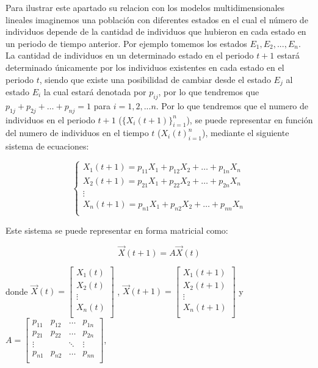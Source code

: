 Para ilustrar este apartado su relacion con los modelos multidimensionales lineales imaginemos una población con diferentes estados en el cual el número de individuos depende de la cantidad de individuos que hubieron en cada estado en un periodo de tiempo anterior. Por ejemplo tomemos los estados $E_1, E_2,...,E_n$. La cantidad de individuos en un determinado estado en el periodo $t+1$ estará determinado únicamente por los individuos existentes en cada estado en el periodo $t$, siendo que existe una posibilidad de cambiar desde el estado $E_j$ al estado $E_i$ la cual estará denotada por $p_{ij}$, por lo que tendremos que $p_{1j} + p_{2j} + \dots + p_{nj} = 1$ para $i = 1,2,...n$. Por lo que tendremos que el numero de individuos en el periodo $t+1$ ($\{X_i(t+1)\}^n_{i=1}$), se puede representar en función del numero de individuos en el tiempo $t$ (${X_i(t)}^n_{i=1}$), mediante el siguiente sistema de ecuaciones:

\[
	\begin{cases}
	 X_{1}(t+1) = p_{11}X_{1} + p_{12}X_{2} + \dots + p_{1n}X_{n}\\
	 X_{2}(t+1) = p_{21}X_{1} + p_{22}X_{2} + \dots + p_{2n}X_{n}\\
	 \vdots\\
	 X_{n}(t+1) = p_{n1}X_{1} + p_{n2}X_{2} + \dots + p_{nn}X_{n}\\
	\end{cases}
\]


Este sistema se puede representar en forma matricial como:

\[
  \vec{X}(t+1) = A\vec{X}(t)
\]

donde $\vec{X}(t) = 
\left[\begin{array}{c} X_{1}(t)\\ X_{2}(t)\\ \vdots\\ X_{n}(t)\\ \end{array}\right]$ ,
$\vec{X}(t+1) = \left[\begin{array}{c} X_{1}(t+1)\\ X_{2}(t+1)\\ \vdots\\ X_{n}(t+1)\\ \end{array}\right]$ y 
$A = \left[\begin{array}{cccc}
		p_{11}& p_{12}& \dots & p_{1n}\\
		p_{21}& p_{22}& \dots & p_{2n}\\
		\vdots & & \ddots & \vdots\\
		p_{n1}& p_{n2}& \dots & p_{nn}\\
\end{array}\right]$,

